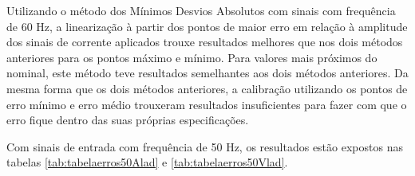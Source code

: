 \begin{table}[htb]
\end{table}

Utilizando o método dos Mínimos Desvios Absolutos com sinais com frequência de 60 Hz, a linearização à partir dos pontos de maior erro em relação à amplitude dos sinais de corrente aplicados trouxe resultados melhores que nos dois métodos anteriores para os pontos máximo e mínimo. Para valores mais próximos do nominal, este método teve resultados semelhantes aos dois métodos anteriores. Da mesma forma que os dois métodos anteriores, a calibração utilizando os pontos de erro mínimo e erro médio trouxeram resultados insuficientes para fazer com que o erro fique dentro das suas próprias especificações.

Com sinais de entrada com frequência de 50 Hz, os resultados estão expostos nas tabelas \ref{tab:tabelaerros50Alad} e \ref{tab:tabelaerros50Vlad}.

